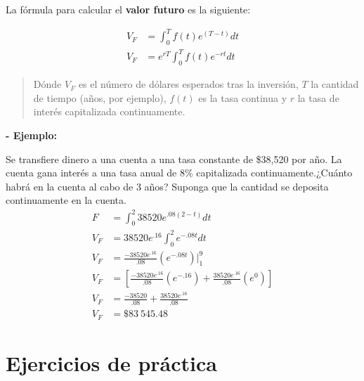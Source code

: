 \documentclass{article}
\begin{document}
                    La fórmula para calcular el \textbf{valor futuro} es la siguiente:

                    \begin{equation}
                    \begin{split}
                        V_F &=\int_{0}^{T} f(t) e^{(T-t)} d t \\
                        V_F &= e^{r T} \int_{0}^{T} f(t) e^{-r t} d t
                    \end{split}
                    \end{equation}

                    \begin{quote}
                        Dónde $V_F$ es el número de dólares esperados tras la inversión, $T$ la cantidad de tiempo (años, por ejemplo), $f(t)$ es la tasa continua y $r$ la tasa de interés capitalizada continuamente.
                    \end{quote}

                    \textbf{- Ejemplo:}

                    Se transfiere dinero a una cuenta a una tasa constante de \$38,520 por año. La cuenta gana interés a una tasa anual de 8\% capitalizada continuamente.¿Cuánto habrá en la cuenta al cabo de 3 años? Suponga que la cantidad se deposita continuamente en la cuenta.
                    \begin{equation*}
                    \begin{split}
                        F &= \int_{0}^{2} 38520e^{.08(2-t)} dt \\
                        V_F &= 38520e^{.16}\int_{0}^{2}e^{-.08t} dt \\
                        V_F &= \frac{-38520e^{.16}}{.08}(e^{-.08t})\Biggr|_{1}^{9} \\
                        V_F &= \left[ \frac{-38520e^{.16}}{.08}(e^{-.16})+\frac{38520e^{.16}}{.08}(e^{0})\right] \\
                        V_F &= \frac{-38520}{.08}+\frac{38520e^{.16}}{.08}\\
                        V_F &=\$83\ 545.48
                    \end{split}
                    \end{equation*}
                    
        \section{Ejercicios de práctica}
\end{document}
